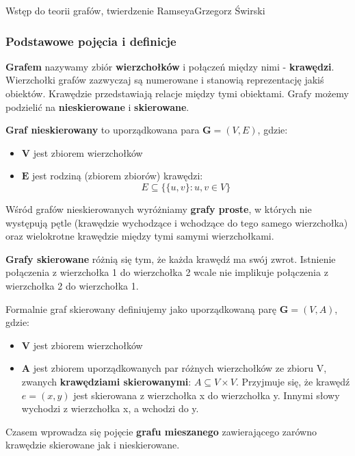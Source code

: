 \begin{referat}{Wstęp do teorii grafów, twierdzenie Ramseya}{Grzegorz Świrski}

\begin{teoria}
\subsubsection{Podstawowe pojęcia i definicje}

\textbf{Grafem} nazywamy zbiór \textbf{wierzchołków} i połączeń między nimi - \textbf{krawędzi}. Wierzchołki grafów zazwyczaj są numerowane i stanowią reprezentację jakiś obiektów. Krawędzie przedstawiają relacje między tymi obiektami. Grafy możemy podzielić na \textbf{nieskierowane} i \textbf{skierowane}.

\textbf{Graf nieskierowany} to uporządkowana para $\mathbf{G}=\left( V,E \right)$, gdzie:
\begin{itemize}
 \item $\mathbf{V}$ jest zbiorem wierzchołków
 \item $\mathbf{E}$ jest rodziną (zbiorem zbiorów) krawędzi: 
    $$E\subseteq \{ \{u,v\} : u,v \in V\}$$
\end{itemize}

Wśród grafów nieskierowanych wyróżniamy \textbf{grafy proste}, w których nie występują pętle (krawędzie wychodzące i wchodzące do tego samego wierzchołka) oraz wielokrotne krawędzie między tymi samymi wierzchołkami.

\textbf{Grafy skierowane} różnią się tym, że każda krawędź ma swój zwrot. Istnienie połączenia z wierzchołka 1 do wierzchołka 2 wcale nie implikuje połączenia z wierzchołka 2 do wierzchołka 1.

Formalnie graf skierowany definiujemy jako uporządkowaną parę $\mathbf{G}=\left( V,A \right)$, gdzie:
\begin{itemize}
 \item $\mathbf{V}$ jest zbiorem wierzchołków
 \item $\mathbf{A}$ jest zbiorem uporządkowanych par różnych wierzchołków ze zbioru V, zwanych \textbf{krawędziami skierowanymi}: $A\subseteq V \times V$.
 Przyjmuje się, że krawędź $e = \left( x, y \right)$ jest skierowana z wierzchołka x do wierzchołka y. Innymi słowy wychodzi z wierzchołka x, a wchodzi do y.
\end{itemize}

Czasem wprowadza się pojęcie \textbf{grafu mieszanego} zawierającego zarówno krawędzie skierowane jak i nieskierowane.


\end{teoria}
\end{referat}
